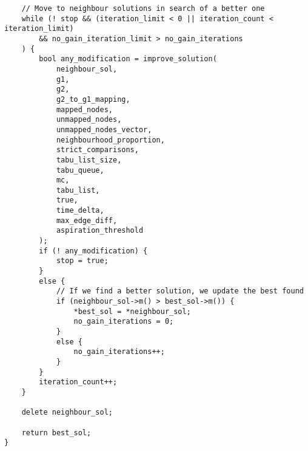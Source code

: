 \begin{lstlisting}
    // Move to neighbour solutions in search of a better one
    while (! stop && (iteration_limit < 0 || iteration_count < iteration_limit)
        && no_gain_iteration_limit > no_gain_iterations
    ) {
        bool any_modification = improve_solution(
            neighbour_sol,
            g1,
            g2,
            g2_to_g1_mapping,
            mapped_nodes,
            unmapped_nodes,
            unmapped_nodes_vector,
            neighbourhood_proportion,
            strict_comparisons,
            tabu_list_size,
            tabu_queue,
            mc,
            tabu_list,
            true,
            time_delta,
            max_edge_diff,
            aspiration_threshold
        );
        if (! any_modification) {
            stop = true;
        }
        else {
            // If we find a better solution, we update the best found
            if (neighbour_sol->m() > best_sol->m()) {
                *best_sol = *neighbour_sol;
                no_gain_iterations = 0;
            }
            else {
                no_gain_iterations++;
            }
        }
        iteration_count++;
    }

    delete neighbour_sol;

    return best_sol;
}

\end{lstlisting}

